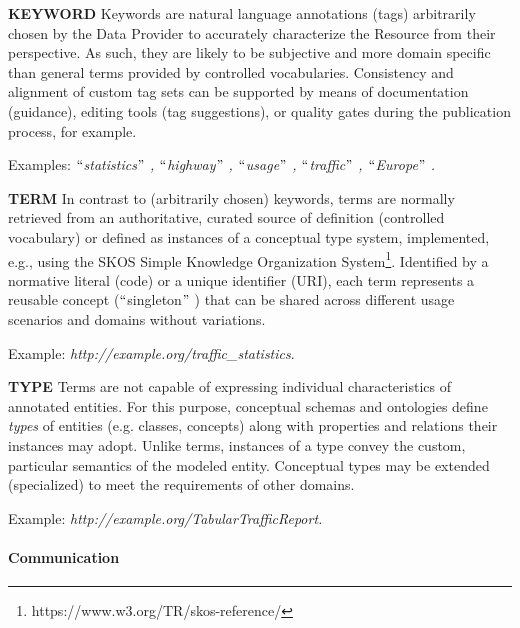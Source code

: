 \textbf{KEYWORD} Keywords are natural language annotations (tags) arbitrarily chosen by the Data Provider to accurately characterize the Resource from their perspective. As such, they are likely to be subjective and more domain specific than general terms provided by controlled vocabularies. Consistency and alignment of custom tag sets can be supported by means of documentation (guidance), editing tools (tag suggestions), or quality gates during the publication process, for example. 

Examples: \textit{$``$statistics$"$ , $``$highway$"$ , $``$usage$"$ , $``$traffic$"$ , $``$Europe$"$ .}

\textbf{TERM} In contrast to (arbitrarily chosen) keywords, terms are normally retrieved from an authoritative, curated source of definition (controlled vocabulary) or defined as instances of a conceptual type system, implemented, e.g., using the SKOS Simple Knowledge Organization System\footnote{https://www.w3.org/TR/skos-reference/}. Identified by a normative literal (code) or a unique identifier (URI), each term represents a reusable concept ($``$singleton$"$ ) that can be shared across different usage scenarios and domains without variations. 

Example: \textit{http://example.org/traffic\_statistics}. 

\textbf{TYPE} Terms are not capable of expressing individual characteristics of annotated entities. For this purpose, conceptual schemas and ontologies define \textit{types} of entities (e.g. classes, concepts) along with properties and relations their instances may adopt. Unlike terms, instances of a type convey the custom, particular semantics of the modeled entity. Conceptual types may be extended (specialized) to meet the requirements of other domains. 

Example: \textit{http://example.org/TabularTrafficReport.}\par

\paragraph{Communication\\}


